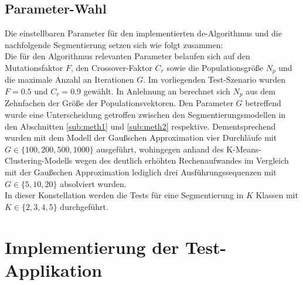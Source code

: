 		\subsection{Parameter-Wahl}
		\label{sub:de-params}
			Die einstellbaren Parameter für den implementierten \gls{de}-Algorithmus und die nachfolgende Segmentierung setzen sich wie folgt zusammen:\\
			Die für den Algorithmus relevanten Parameter belaufen sich auf den Mutationsfaktor $F$, den Crossover-Faktor $C_{r}$ sowie die Populationsgröße $N_{p}$ und die maximale Anzahl an Iterationen $G$. Im vorliegenden Test-Szenario wurden $F = 0.5$ und $C_{r} = 0.9$ gewählt. In Anlehnung an \cite[S. 14]{cuevas-meth1} berechnet sich $N_{p}$ aus dem Zehnfachen der Größe der Populationsvektoren. Den Parameter $G$ betreffend wurde eine Unterscheidung getroffen zwischen den Segmentierungsmodellen in den Abschnitten \ref{sub:meth1} und \ref{sub:meth2} respektive. Dementsprechend wurden mit dem Modell der Gaußschen Approximation vier Durchläufe mit $G \in \{100, 200, 500, 1000\}$ ausgeführt, wohingegen anhand des K-Means-Clustering-Modells wegen des deutlich erhöhten Rechenaufwandes im Vergleich mit der Gaußschen Approximation lediglich drei Ausführungssequenzen mit $G \in \{5, 10, 20\}$ absolviert wurden.\\
			In dieser Konstellation werden die Tests für eine Segmentierung in $K$ Klassen mit $K \in \{2,3,4,5\}$ durchgeführt.

	\section{Implementierung der Test-Applikation}
	\label{sec:implementation}
